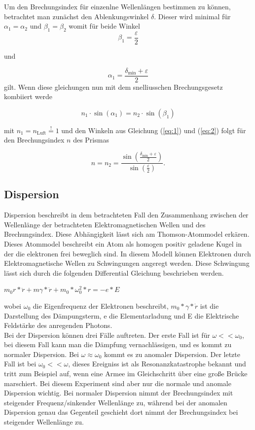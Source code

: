 Um den Brechungsindex für einzenlne Wellenlängen bestimmen zu 
können, betrachtet man zunächst den Ablenkungswinkel $\delta$. 
Dieser wird minimal für $\alpha_1 = \alpha_2$ und $\beta_1 = 
\beta_2$ womit für beide Winkel
\begin{equation}
    \beta_1 = \frac{\varepsilon}{2}
    \label{eq:1}
\end{equation}

und

\begin{equation}
    \alpha_1 = \frac{\delta_{\text{min}} + \varepsilon}{2}
    \label{eq:2}
\end{equation}
gilt. Wenn diese gleichungen nun mit dem snelliusschen Brechungsgesetz kombiiert werde

\begin{equation}
    n_1 \cdot \sin(\alpha_1) = n_2 \cdot \sin(\beta_1)
    \label{eq:3}
\end{equation}

mit $n_1 = n_{\text{Luft}} \stackrel{!}{=} 1$ und den Winkeln aus Gleichung (\ref{eq:1}) und (\ref{eq:2}) folgt für den Brechungsindex $n$ des Prismas

\begin{equation}
    n = n_2 = \frac{\sin\left(\frac{\delta_{\text{min}} + \varepsilon}{2}\right)}{\sin\left(\frac{\varepsilon}{2}\right)} .
    \label{eq:4}
\end{equation}


\subsection{Dispersion}
Dispersion beschreibt in dem betrachteten Fall den Zusammenhang 
zwischen der Wellenlänge der betrachteten Elektromagnetischen 
Wellen und des Brechungsindex. Diese Abhängigkeit lässt sich am 
Thomson-Atommodel erkären. Dieses Atommodel beschreibt ein Atom 
als homogen positiv geladene Kugel in der die elektronen frei 
beweglich sind. In diesem Modell können Elektronen durch 
Elektromagnetische Wellen zu Schwingungen angeregt werden. 
Diese Schwingung lässt sich durch die folgenden Differential 
Gleichung beschrieben werden. 
\begin{center}
    $m_0r*\ddot{r} + m\gamma*\dot{r} + m_0*\omega_0^2*r=-e*E$
\end{center}
wobei $\omega_0$ die Eigenfrequenz der Elektronen beschreibt, 
$m_0*\gamma*\dot{r}$ ist die Darstellung des Dämpungsterm, e die 
Elementarladung und E die Elektrische Feldstärke des anregenden 
Photons.\\
Bei der Dispersion können drei Fälle auftreten. Der erste Fall 
ist für $\omega<<\omega_0$, bei diesem Fall kann man die Dämpfung 
vernachlässigen, und es kommt zu normaler Dispersion. Bei 
$\omega\approx \omega_0$ kommt es zu anomaler Dispersion. Der 
letzte Fall ist bei $\omega_0 << \omega$, dieses Ereigniss ist 
als Resonanzkatastrophe bekannt und tritt zum Beispiel auf, wenn 
eine Armee im Gleichschritt über eine große Brücke marschiert. 
Bei diesem Experiment sind aber nur die normale und anomale 
Dispersion wichtig. Bei normaler Dispersion nimmt der 
Brechungsindex mit steigender Frequenz/sinkender Wellenlänge zu, 
während bei der anomalen Dispersion genau das Gegenteil geschieht 
dort nimmt der Brechungsindex bei steigender Wellenlänge zu.
